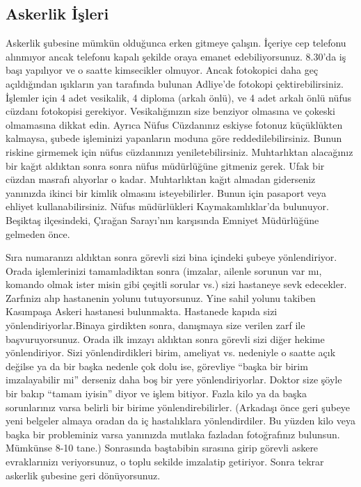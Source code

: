 \documentclass[12pt]{article}
\begin{document}
\subsection{Askerlik İşleri}

Askerlik şubesine mümkün olduğunca erken gitmeye çalışın. İçeriye cep telefonu alınmıyor ancak telefonu kapalı şekilde oraya emanet edebiliyorsunuz. 8.30'da iş başı yapılıyor ve o saatte kimsecikler olmuyor. Ancak fotokopici daha geç açıldığından ışıkların yan tarafında bulunan Adliye'de fotokopi çektirebilirsiniz. İşlemler için 4 adet vesikalik, 4 diploma (arkalı önlü), ve 4 adet arkalı önlü nüfus cüzdanı fotokopisi gerekiyor. Vesikalığınızın size benziyor olmasına ve çokeski olmamasına dikkat edin. Ayrıca Nüfus Cüzdanınız eskiyse fotonuz küçüklükten kalmaysa, şubede işleminizi yapanların moduna göre reddedilebilirsiniz. Bunun riskine girmemek için nüfus cüzdanınızı yeniletebilirsiniz. Muhtarlıktan alacağınız bir kağıt aldıktan sonra sonra nüfus müdürlüğüne gitmeniz gerek. Ufak bir cüzdan masrafı alıyorlar o kadar. Muhtarlıktan kağıt almadan giderseniz yanınızda ikinci bir kimlik olmasını isteyebilirler. Bunun için pasaport veya ehliyet kullanabilirsiniz. Nüfus müdürlükleri Kaymakamlıklar'da bulunuyor. Beşiktaş ilçesindeki, Çırağan Sarayı'nın karşısında Emniyet Müdürlüğüne gelmeden önce. 

Sıra numaranızı aldıktan sonra görevli sizi bina içindeki şubeye yönlendiriyor. Orada işlemlerinizi tamamladiktan sonra (imzalar, ailenle sorunun var mı, komando olmak ister misin gibi çeşitli sorular vs.) sizi hastaneye sevk edecekler. Zarfınizı alıp hastanenin yolunu tutuyorsunuz. Yine sahil yolunu takiben Kasımpaşa Askeri hastanesi bulunmakta. Hastanede kapıda sizi yönlendiriyorlar.Binaya girdikten sonra, danışmaya size verilen zarf ile başvuruyorsunuz. Orada ilk imzayı aldıktan sonra görevli sizi diğer hekime yönlendiriyor. Sizi yönlendirdikleri birim, ameliyat vs. nedeniyle o saatte açık değilse ya da bir başka nedenle çok dolu ise, görevliye ``başka bir birim imzalayabilir mi'' derseniz daha boş bir yere yönlendiriyorlar. Doktor size şöyle bir bakıp ``tamam iyisin'' diyor ve işlem bitiyor. Fazla kilo ya da başka sorunlarınız varsa belirli bir birime yönlendirebilirler. (Arkadaşı önce geri şubeye yeni belgeler almaya oradan da iç hastalıklara yönlendirdiler. Bu yüzden kilo veya başka bir probleminiz varsa yanınızda mutlaka fazladan fotoğrafınız bulunsun. Mümkünse 8-10 tane.) Sonrasında baştabibin sırasına girip görevli askere evraklarınizı veriyorsunuz, o toplu sekilde imzalatip getiriyor. Sonra tekrar askerlik şubesine geri dönüyorsunuz. 
\end{document}
